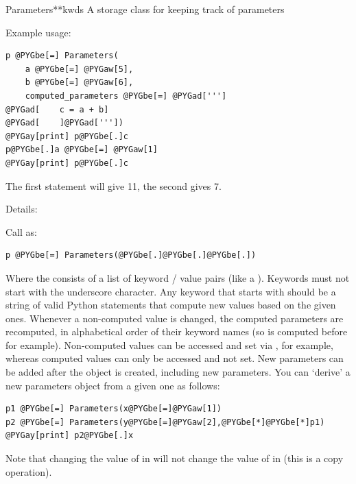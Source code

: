 \documentclass[letterpaper,10pt]{manual}
\begin{document}
\hypertarget{brian.Parameters}{}\begin{classdesc}{Parameters}{**kwds}
A storage class for keeping track of parameters

Example usage:

\begin{Verbatim}[commandchars=@\[\]]
p @PYGbe[=] Parameters(
    a @PYGbe[=] @PYGaw[5],
    b @PYGbe[=] @PYGaw[6],
    computed_parameters @PYGbe[=] @PYGad[''']
@PYGad[    c = a + b]
@PYGad[    ]@PYGad['''])
@PYGay[print] p@PYGbe[.]c
p@PYGbe[.]a @PYGbe[=] @PYGaw[1]
@PYGay[print] p@PYGbe[.]c
\end{Verbatim}

The first  statement will give 11, the second gives 7.

Details:

Call as:

\begin{Verbatim}[commandchars=@\[\]]
p @PYGbe[=] Parameters(@PYGbe[.]@PYGbe[.]@PYGbe[.])
\end{Verbatim}

Where the  consists of a list of keyword / value pairs (like a ).
Keywords must not start with the underscore \code{\_} character. Any
keyword that starts with  should be a string of valid Python statements
that compute new values based on the given ones. Whenever a non-computed value is
changed, the computed parameters are recomputed, in alphabetical order of their
keyword names (so  is computed before  for example).
Non-computed values can be accessed and set via ,  for example, whereas
computed values can only be accessed and not set. New parameters can be added
after the \hyperlink{brian.Parameters}{} object is created, including new  parameters. You
can `derive' a new parameters object from a given one as follows:

\begin{Verbatim}[commandchars=@\[\]]
p1 @PYGbe[=] Parameters(x@PYGbe[=]@PYGaw[1])
p2 @PYGbe[=] Parameters(y@PYGbe[=]@PYGaw[2],@PYGbe[*]@PYGbe[*]p1)
@PYGay[print] p2@PYGbe[.]x
\end{Verbatim}

Note that changing the value of  in  will not change the value of  in  (this
is a copy operation).
\end{classdesc}

\resetcurrentobjects
{}
\end{document}
